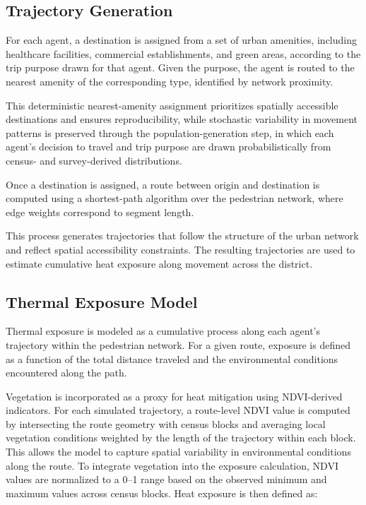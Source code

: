 \documentclass{wscpaperproc}
\theoremstyle{wsc}
\begin{document}
\subsection{Trajectory Generation}

For each agent, a destination is assigned from a set of urban amenities, including healthcare facilities, commercial establishments, and green areas, according to the trip purpose drawn for that agent. Given the purpose, the agent is routed to the nearest amenity of the corresponding type, identified by network proximity.

This deterministic nearest-amenity assignment prioritizes spatially accessible destinations and ensures reproducibility, while stochastic variability in movement patterns is preserved through the population-generation step, in which each agent's decision to travel and trip purpose are drawn probabilistically from census- and survey-derived distributions.

Once a destination is assigned, a route between origin and destination is computed using a shortest-path algorithm over the pedestrian network, where edge weights correspond to segment length.

This process generates trajectories that follow the structure of the urban network and reflect spatial accessibility constraints. The resulting trajectories are used to estimate cumulative heat exposure along movement across the district.


\subsection{Thermal Exposure Model}

Thermal exposure is modeled as a cumulative process along each agent's trajectory within the pedestrian network. For a given route, exposure is defined as a function of the total distance traveled and the environmental conditions encountered along the path.

Vegetation is incorporated as a proxy for heat mitigation using NDVI-derived indicators. For each simulated trajectory, a route-level NDVI value is computed by intersecting the route geometry with census blocks and averaging local vegetation conditions weighted by the length of the trajectory within each block. This allows the model to capture spatial variability in environmental conditions along the route. %
To integrate vegetation into the exposure calculation, NDVI values are normalized to a 0--1 range based on the observed minimum and maximum values across census blocks. Heat exposure is then defined as:
\end{document}
